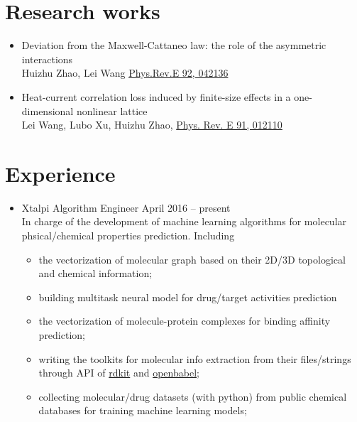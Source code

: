 \documentclass[letterpaper,11pt]{article}
\begin{document}
\section{Research works}
\begin{itemize}
\item Deviation from the Maxwell-Cattaneo law: the role of the asymmetric interactions \\
Huizhu Zhao, Lei Wang \href{https://journals.aps.org/pre/abstract/10.1103/PhysRevE.92.042136}{Phys.Rev.E 92, 042136}
\item Heat-current correlation loss induced by finite-size effects in a one-dimensional nonlinear lattice \\
Lei Wang, Lubo Xu, Huizhu Zhao, \href{https://journals.aps.org/pre/abstract/10.1103/PhysRevE.91.012110}{Phys. Rev. E 91, 012110}
\end{itemize}

\section{Experience}
\begin{itemize}
\item Xtalpi \qquad  Algorithm Engineer \qquad April 2016 -- present \\
    In charge of the development of machine learning algorithms for molecular 
    phsical/chemical properties prediction. Including 
    \begin{itemize}
        \item the vectorization of molecular graph based on their 2D/3D topological and chemical 
            information; 
        \item building multitask neural model for drug/target activities prediction
        \item the vectorization of molecule-protein complexes for binding affinity prediction; 
        \item writing the toolkits for molecular info extraction from their files/strings 
            through API of \href{http://www.rdkit.org}{rdkit} and \href{http://openbabel.org/docs/current/index.html}{openbabel}; 
        \item collecting molecular/drug datasets (with python) from public chemical databases for training machine learning models;
    \end{itemize}
\end{itemize}
\end{document}
